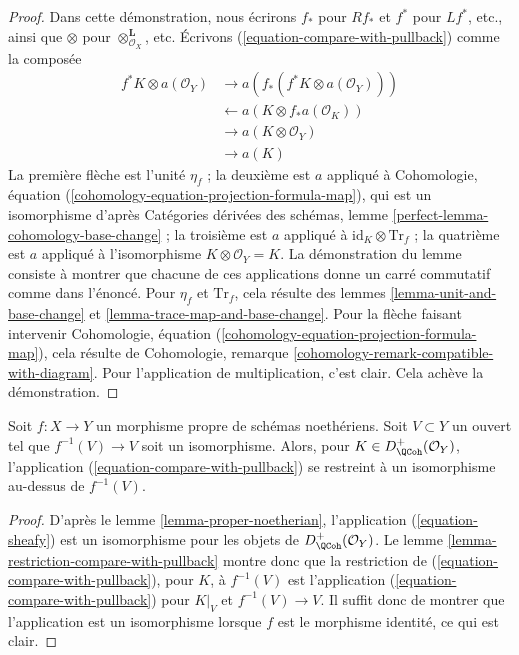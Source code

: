 \begin{proof}
Dans cette démonstration, nous écrirons $f_*$ pour $Rf_*$ et $f^*$ pour $Lf^*$, etc., ainsi que $\otimes$ pour $\otimes^\mathbf{L}_{\mathcal{O}_X}$, etc. Écrivons (\ref{equation-compare-with-pullback}) comme la composée
\begin{align*}
f^*K \otimes a(\mathcal{O}_Y)
& \to
a(f_*(f^*K \otimes a(\mathcal{O}_Y))) \\
& \leftarrow
a(K \otimes f_*a(\mathcal{O}_K)) \\
& \to
a(K \otimes \mathcal{O}_Y) \\
& \to
a(K)
\end{align*}
La première flèche est l'unité $\eta_f$ ; la deuxième est $a$ appliqué à Cohomologie, équation (\ref{cohomology-equation-projection-formula-map}), qui est un isomorphisme d'après Catégories dérivées des schémas, lemme \ref{perfect-lemma-cohomology-base-change} ; la troisième est $a$ appliqué à $\text{id}_K \otimes \text{Tr}_f$ ; la quatrième est $a$ appliqué à l'isomorphisme $K \otimes \mathcal{O}_Y = K$. La démonstration du lemme consiste à montrer que chacune de ces applications donne un carré commutatif comme dans l'énoncé. Pour $\eta_f$ et $\text{Tr}_f$, cela résulte des lemmes \ref{lemma-unit-and-base-change} et \ref{lemma-trace-map-and-base-change}. Pour la flèche faisant intervenir Cohomologie, équation (\ref{cohomology-equation-projection-formula-map}), cela résulte de Cohomologie, remarque \ref{cohomology-remark-compatible-with-diagram}. Pour l'application de multiplication, c'est clair. Cela achève la démonstration.
\end{proof}

\begin{lemma}
\label{lemma-compare-on-open}
Soit $f : X \to Y$ un morphisme propre de schémas noethériens. Soit $V \subset Y$ un ouvert tel que $f^{-1}(V) \to V$ soit un isomorphisme. Alors, pour $K \in D_\QCoh^+(\mathcal{O}_Y)$, l'application (\ref{equation-compare-with-pullback}) se restreint à un isomorphisme au-dessus de $f^{-1}(V)$.
\end{lemma}

\begin{proof}
D'après le lemme \ref{lemma-proper-noetherian}, l'application (\ref{equation-sheafy}) est un isomorphisme pour les objets de $D_\QCoh^+(\mathcal{O}_Y)$. Le lemme \ref{lemma-restriction-compare-with-pullback} montre donc que la restriction de (\ref{equation-compare-with-pullback}), pour $K$, à $f^{-1}(V)$ est l'application (\ref{equation-compare-with-pullback}) pour $K|_V$ et $f^{-1}(V) \to V$. Il suffit donc de montrer que l'application est un isomorphisme lorsque $f$ est le morphisme identité, ce qui est clair.
\end{proof}

